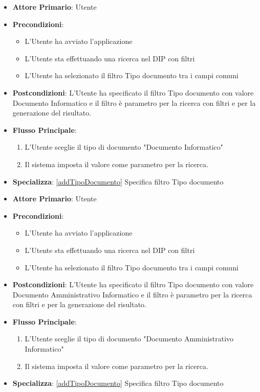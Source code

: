 \begin{itemize}
      \item \textbf{Attore Primario}: Utente
      \item \textbf{Precondizioni}: \begin{itemize}
            \item L'Utente ha avviato l'applicazione
            \item L'Utente sta effettuando una ricerca nel DIP con filtri
            \item L'Utente ha selezionato il filtro Tipo documento tra i campi comuni
      \end{itemize}
      \item \textbf{Postcondizioni}: L'Utente ha specificato il filtro Tipo documento con valore Documento Informatico e il filtro è parametro per la ricerca con filtri e per la generazione del risultato.
      \item \textbf{Flusso Principale}:
      \begin{enumerate}
            \item L'Utente sceglie il tipo di documento "Documento Informatico"
            \item Il sistema imposta il valore come parametro per la ricerca.
      \end{enumerate}
      \item \textbf{Specializza}: \ref{addTipoDocumento} Specifica filtro Tipo documento
\end{itemize}

\begin{itemize}
      \item \textbf{Attore Primario}: Utente
      \item \textbf{Precondizioni}: \begin{itemize}
            \item L'Utente ha avviato l'applicazione
            \item L'Utente sta effettuando una ricerca nel DIP con filtri
            \item L'Utente ha selezionato il filtro Tipo documento tra i campi comuni
      \end{itemize}
      \item \textbf{Postcondizioni}: L'Utente ha specificato il filtro Tipo documento con valore Documento Amministrativo Informatico e il filtro è parametro per la ricerca con filtri e per la generazione del risultato.
      \item \textbf{Flusso Principale}:
      \begin{enumerate}
            \item L'Utente sceglie il tipo di documento "Documento Amministrativo Informatico"
            \item Il sistema imposta il valore come parametro per la ricerca.
      \end{enumerate}
      \item \textbf{Specializza}: \ref{addTipoDocumento} Specifica filtro Tipo documento
\end{itemize}

